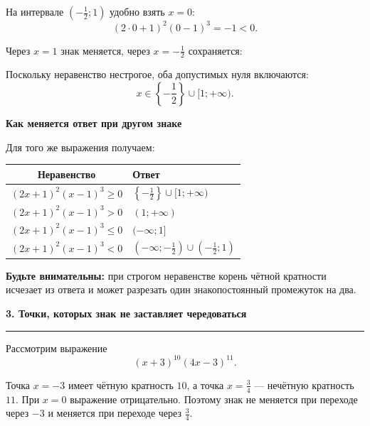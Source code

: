 \documentclass[a4paper,12pt]{article}
\newcommand{\sectiontitle}[1]{%
  \vspace{0.65em}
  {\Large\bfseries\textcolor{darkaccent}{#1}}\par
  \vspace{0.25em}
  {\color{accent}\rule{\linewidth}{0.5pt}}
  \vspace{0.45em}
}
\newcommand{\subsectiontitle}[1]{%
  \vspace{0.5em}
  {\large\bfseries\textcolor{darkaccent}{#1}}\par
  \vspace{0.2em}
}
\newcommand{\important}[1]{\textbf{\textcolor{darkaccent}{#1}}}
\newcommand{\closedpoint}[2]{%
  \filldraw[accent] (#1,0) circle (2.4pt)
    node[below=7pt, text=black] {$#2$};
}
\begin{document}
На интервале $\left(-\frac12;1\right)$ удобно взять $x=0$:
\[
(2\cdot0+1)^2(0-1)^3=-1<0.
\]

Через $x=1$ знак меняется, через $x=-\frac12$ сохраняется:

\begin{center}
\end{center}

Поскольку неравенство нестрогое, оба допустимых нуля включаются:
\[
\boxed{x\in\left\{-\frac12\right\}\cup[1;+\infty)}.
\]

\subsectiontitle{Как меняется ответ при другом знаке}

Для того же выражения получаем:

\begin{center}
\renewcommand{\arraystretch}{1.4}
\begin{tabularx}{\linewidth}{@{}c X@{}}
\toprule
Неравенство & Ответ \\
\midrule
$(2x+1)^2(x-1)^3\ge0$ & $\left\{-\frac12\right\}\cup[1;+\infty)$ \\
$(2x+1)^2(x-1)^3>0$ & $(1;+\infty)$ \\
$(2x+1)^2(x-1)^3\le0$ & $(-\infty;1]$ \\
$(2x+1)^2(x-1)^3<0$ & $(-\infty;-\frac12)\cup\left(-\frac12;1\right)$ \\
\bottomrule
\end{tabularx}
\end{center}

\important{Будьте внимательны:} при строгом неравенстве корень чётной кратности исчезает из ответа и может разрезать один знакопостоянный промежуток на два.

\sectiontitle{3. Точки, которых знак не заставляет чередоваться}

Рассмотрим выражение
\[
(x+3)^{10}(4x-3)^{11}.
\]

Точка $x=-3$ имеет чётную кратность $10$, а точка $x=\frac34$ --- нечётную кратность $11$. При $x=0$ выражение отрицательно. Поэтому знак не меняется при переходе через $-3$ и меняется при переходе через $\frac34$.
\end{document}
